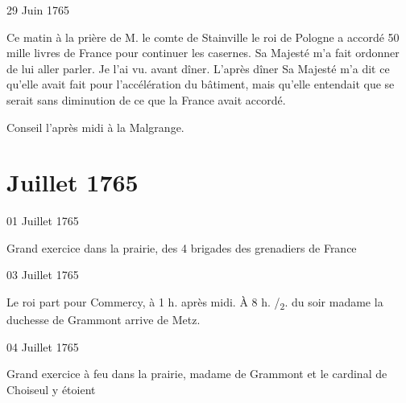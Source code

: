                      \begin{diary}{29 Juin 1765}{}

                         Ce matin à la prière de M. le comte de
                              Stainville
                           le roi de Pologne a accordé 50 mille livres
                              de France pour continuer les casernes. Sa Majesté m'a
                           fait ordonner de lui aller parler. Je l'ai vu.
                           avant dîner. L'après dîner Sa Majesté m'a dit
                           ce qu'elle avait fait pour l'accélération du
                           bâtiment, mais qu'elle entendait que se serait sans diminution de ce que la France avait
                           accordé. \bigskip


                         Conseil l'après midi à la Malgrange. \bigskip


                     \end{diary}
                  \chapter*{Juillet 1765}


                     \begin{diary}{01 Juillet 1765}{}

                         Grand exercice dans la prairie, des
                           4 brigades des grenadiers de France
                        \bigskip


                     \end{diary}

                     \begin{diary}{03 Juillet 1765}{}


                           Le roi part pour Commercy, à 1 h.
                           après midi. À 8 h. /\textsubscript{2}. du
                           soir madame la
                              duchesse de Grammont arrive de Metz. \bigskip


                     \end{diary}

                     \begin{diary}{04 Juillet 1765}{}

                         Grand exercice à feu dans la prairie,
                              madame
                              de Grammont et le cardinal
                              de Choiseul y
                           étoient \bigskip


                     \end{diary}

